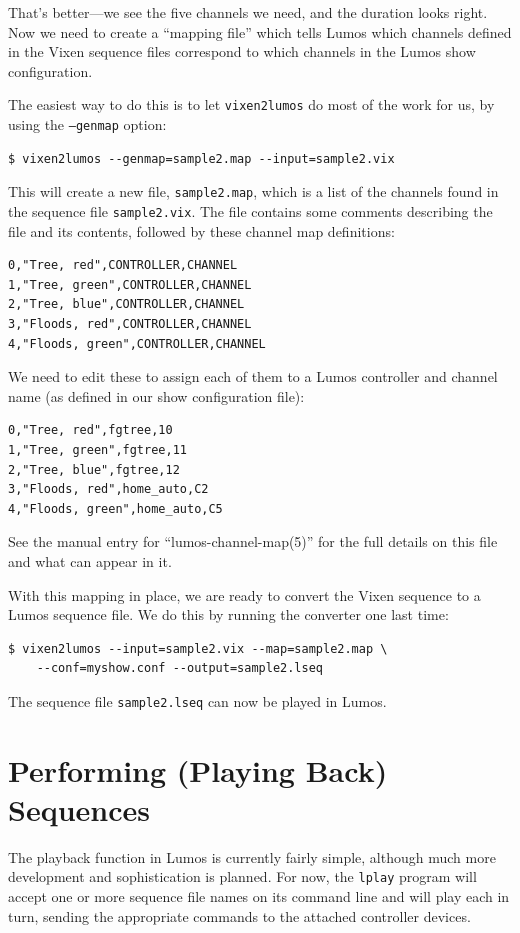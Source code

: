 \documentclass{article}
\begin{document}
That's better---we see the five channels we need, and the duration looks right.
Now we need to create a ``mapping file'' which tells Lumos which channels
defined in the Vixen sequence files correspond to which channels in the
Lumos show configuration.

The easiest way to do this is to let {\tt vixen2lumos} do most of the work
for us, by using the {\tt --genmap} option:
\begin{verbatim}
$ vixen2lumos --genmap=sample2.map --input=sample2.vix
\end{verbatim}
This will create a new file, {\tt sample2.map}, which is a list of the
channels found in the sequence file {\tt sample2.vix}.  The file contains
some comments describing the file and its contents, followed by these channel
map definitions:
\begin{verbatim}
0,"Tree, red",CONTROLLER,CHANNEL
1,"Tree, green",CONTROLLER,CHANNEL
2,"Tree, blue",CONTROLLER,CHANNEL
3,"Floods, red",CONTROLLER,CHANNEL
4,"Floods, green",CONTROLLER,CHANNEL
\end{verbatim}
We need to edit these to assign each of them to a Lumos controller and
channel name (as defined in our show configuration file):
\begin{verbatim}
0,"Tree, red",fgtree,10
1,"Tree, green",fgtree,11
2,"Tree, blue",fgtree,12
3,"Floods, red",home_auto,C2
4,"Floods, green",home_auto,C5
\end{verbatim}
See the manual entry for ``lumos-channel-map(5)'' for the full details on
this file and what can appear in it.

With this mapping in place, we are ready to convert the Vixen sequence to a
Lumos sequence file.  We do this by running the converter one last time:
\begin{verbatim}
$ vixen2lumos --input=sample2.vix --map=sample2.map \
    --conf=myshow.conf --output=sample2.lseq
\end{verbatim}
The sequence file {\tt sample2.lseq} can now be played in Lumos.

\section{Performing (Playing Back) Sequences}
The playback function in Lumos is currently fairly simple, although much more
development and sophistication is planned.  For now, the {\tt lplay} program
will accept one or more sequence file names on its command line and will play
each in turn, sending the appropriate commands to the attached controller
devices.
\end{document}
